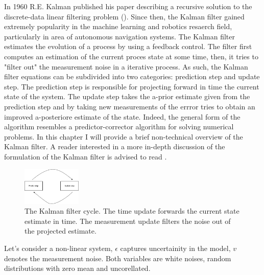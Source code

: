 \documentclass[mscthesis]{usiinfthesis}
\begin{document}
In 1960 R.E. Kalman published his paper describing a recursive solution to the discrete-data linear filtering problem (\citet{paper:kalmanfilter}). Since then, the Kalman filter gained extremely popularity in the machine learning and robotics resaerch field, particularly in area of autonomous navigation systems. The Kalman filter estimates the evolution of a process by using a feedback control. The filter first computes an estimation of the current proces state at some time, then, it tries to "filter out" the measurement  noise in a iterative process. As such, the Kalman filter equations can be subdivided into two categories: prediction step and update step. The prediction step is responsible for projecting forward in time the current state of the system. The update step takes the a-prior estimate given from the prediction step and by taking new measurements of the errror tries to obtain an improved a-posteriore estimate of the state. Indeed, the general form of the algorithm resembles a predictor-corrector algorithm for solving numerical problems. In this chapter I will provide a brief non-technical overview of the Kalman filter. A reader interested in a more in-depth discussion of the formulation of the Kalman filter is advised to read \citet{paper:Maybeck79}.


\begin{figure}[h]
    \centering
    \includegraphics[width=0.25\textwidth]{kalman_diagram.png}
    \caption{The Kalman filter cycle. The time update forwards the current state estimate in time. The measurement update filters the noise out of the projected estimate.}
    \label{fig:kalman_cycle}
\end{figure}

Let's consider a non-linear system, $\epsilon$ captures uncertainity in the model, $v$ denotes the measurement noise. Both variables are white noises, random distributions with zero mean and uncorellated. 
\end{document}
